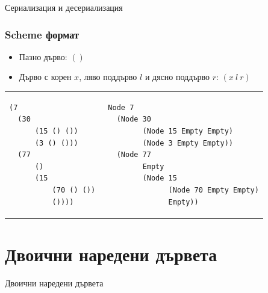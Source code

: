 \documentclass{beamer}
\begin{document}
\begin{frame}
  \centerline{Сериализация и десериализация}
\end{frame}

\begin{frame}[fragile]
  \frametitle{Scheme формат}


\begin{itemize}
  \item Пазно дърво: $()$
  \item Дърво с корен $x$, ляво поддърво $l$ и дясно поддърво $r$: $(x\: l \: r)$
\end{itemize}

\bigskip

\begin{tabular}{l | l}

\begin{minipage}{0.35\textwidth}
\begin{verbatim}
(7 
  (30 
      (15 () ()) 
      (3 () ())) 
  (77 
      () 
      (15 
          (70 () ()) 
          ())))  
\end{verbatim}
\end{minipage}
  
 & 

\begin{minipage}{0.65\textwidth}
\begin{verbatim}
Node 7
  (Node 30 
        (Node 15 Empty Empty)
        (Node 3 Empty Empty))
  (Node 77
        Empty
        (Node 15
              (Node 70 Empty Empty)
              Empty))
\end{verbatim}
\end{minipage}


\end{tabular}



\end{frame}

\section{Двоични наредени дървета}
\begin{frame}
  \centerline{Двоични наредени дървета}
\end{frame}
\end{document}
